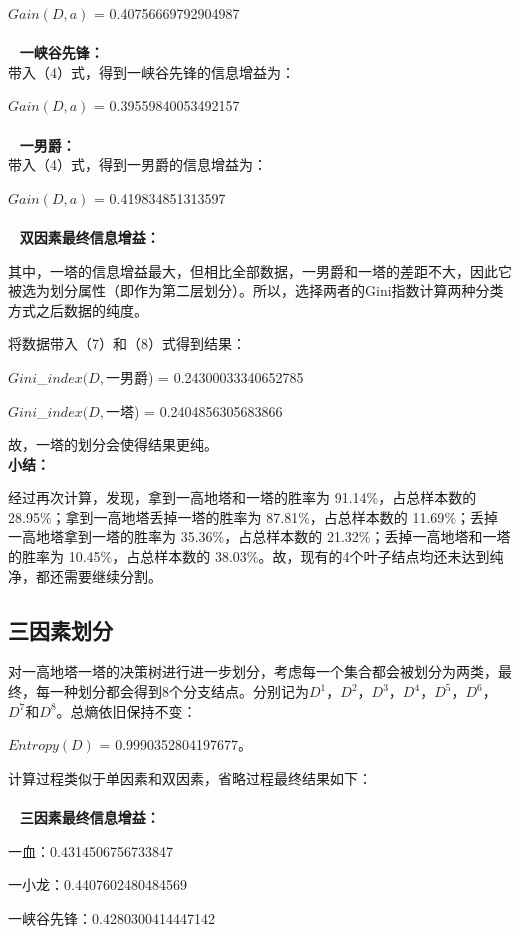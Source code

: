 \documentclass[lang=cn,11pt]{elegantpaper}
\begin{document}
$Gain(D,a)$ = 0.40756669792904987
\\~
\\~
\textbf{一峡谷先锋：}\\
带入（4）式，得到一峡谷先锋的信息增益为：

$Gain(D,a)$ = 0.39559840053492157
\\~
\\~
\textbf{一男爵：}\\
带入（4）式，得到一男爵的信息增益为：

$Gain(D,a)$ = 0.419834851313597
\\~
\\~
\textbf{双因素最终信息增益：}

其中，一塔的信息增益最大，但相比全部数据，一男爵和一塔的差距不大，因此它被选为划分属性（即作为第二层划分）。所以，选择两者的Gini指数计算两种分类方式之后数据的纯度。

将数据带入（7）和（8）式得到结果：

$Gini$\_$index(D,$一男爵) = 0.24300033340652785

$Gini$\_$index(D,$一塔) = 0.2404856305683866

故，一塔的划分会使得结果更纯。\\
\textbf{小结：}

经过再次计算，发现，拿到一高地塔和一塔的胜率为 91.14$ \% $，占总样本数的 28.95$ \% $；拿到一高地塔丢掉一塔的胜率为 87.81$ \% $，占总样本数的 11.69$ \% $；丢掉一高地塔拿到一塔的胜率为 35.36$ \% $，占总样本数的 21.32$ \% $；丢掉一高地塔和一塔的胜率为 10.45$ \% $，占总样本数的 38.03$ \% $。故，现有的4个叶子结点均还未达到纯净，都还需要继续分割。

\subsection{三因素划分}
对一高地塔一塔的决策树进行进一步划分，考虑每一个集合都会被划分为两类，最终，每一种划分都会得到8个分支结点。分别记为$D^1$，$D^2$，$D^3$，$D^4$，$D^5$，$D^6$，$D^7$和$D^8$。总熵依旧保持不变：

$Entropy(D)$  = 0.9990352804197677。

计算过程类似于单因素和双因素，省略过程最终结果如下：
\\~
\\~
\textbf{三因素最终信息增益：}

一血：0.4314506756733847

一小龙：0.4407602480484569

一峡谷先锋：0.4280300414447142
\end{document}
